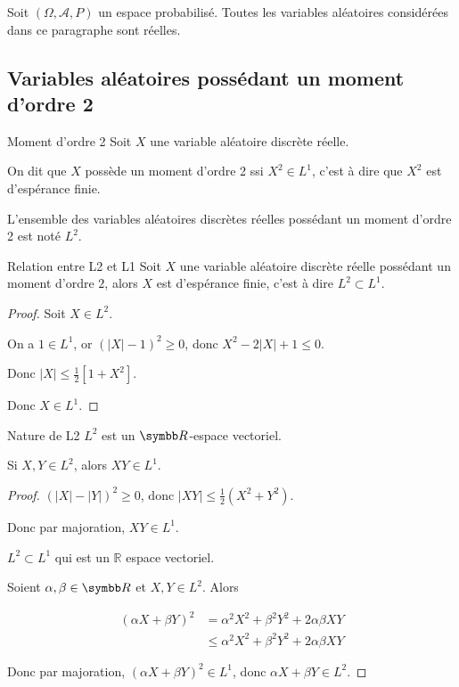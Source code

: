 Soit $(\Omega, \mathcal A, P)$ un espace probabilisé. Toutes les variables aléatoires 
considérées dans ce paragraphe sont réelles. 

\subsection{Variables aléatoires possédant un moment d'ordre 2 }

\begin{definition}{Moment d'ordre 2}{}
    Soit $X$ une variable aléatoire discrète réelle. 

    On dit que $X$ possède un moment d'ordre 2 ssi $X^2 \in L^1$, c'est à dire que
    $X^2$ est d'espérance finie.

    L'ensemble des variables aléatoires discrètes réelles possédant un moment d'ordre 2 
    est noté $L^2$.
\end{definition}



\begin{proposition}{Relation entre L2 et L1}{}
    Soit $X$ une variable aléatoire discrète réelle possédant un moment d'ordre $2$, 
    alors $X$ est d'espérance finie, c'est à dire $L^2 \subset L^1$.
\end{proposition}

\begin{proof}
    Soit $X \in L^2$. 

    On a $1 \in L^1$, or $(|X| -1 )^2 \geqslant 0$, donc 
    $X^2 - 2 |X| + 1 \leqslant 0$. 

    Donc $|X| \leqslant \frac 1 2[1 + X^2]$. 

    Donc $X \in L^1$. 
\end{proof}

\begin{proposition}{Nature de L2}{}
    $L^2$ est un $\R$-espace vectoriel. 
\end{proposition}

 Si $X, Y \in L^2$, alors $XY \in L^1$.


\begin{proof}
    $(|X| - |Y|)^2 \geqslant 0$, donc $|XY| \leqslant \frac 1 2 (X^2 + Y^2)$.

    Donc par majoration, $XY \in L^1$.

    $L^2 \subset L^1$ qui est un $\mathbb R$ espace vectoriel. 

    Soient $\alpha, \beta \in \R$ et $X, Y \in L^2$. Alors 

    \begin{align}
        (\alpha X + \beta Y)^2 & = \alpha^2 X^2 + \beta^2 Y^2 + 2 \alpha \beta XY \\
        & \leqslant \alpha^2 X^2 + \beta^2 Y^2 + 2 \alpha \beta XY
    \end{align}

    Donc par majoration, $(\alpha X + \beta Y)^2 \in L^1$, donc $\alpha X + \beta Y \in L^2$.
\end{proof}

